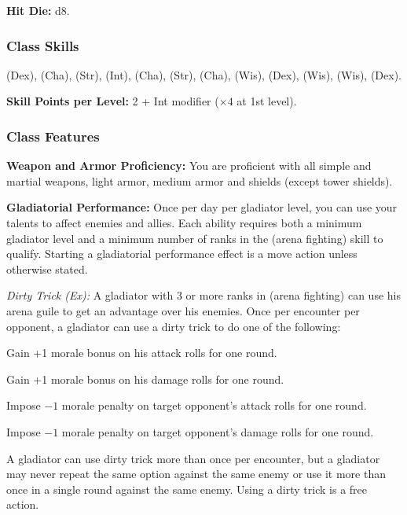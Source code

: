 \textbf{Hit Die:} d8.
\vskip2cm
\subsubsection{Class Skills}
 (Dex),  (Cha),  (Str),  (Int),  (Cha),  (Str),  (Cha),  (Wis),  (Dex),  (Wis),  (Wis),  (Dex).

\textbf{Skill Points per Level:} 2 + Int modifier ($\times4$ at 1st level).

\subsubsection{Class Features}

\textbf{Weapon and Armor Proficiency:} You are proficient with all simple and martial weapons, light armor, medium armor and shields (except tower shields).

\textbf{Gladiatorial Performance:} Once per day per gladiator level, you can use your talents to affect enemies and allies. Each ability requires both a minimum gladiator level and a minimum number of ranks in the  (arena fighting) skill to qualify. Starting a gladiatorial performance effect is a move action unless otherwise stated.

\textit{Dirty Trick (Ex):} A gladiator with 3 or more ranks in  (arena fighting) can use his arena guile to get an advantage over his enemies. Once per encounter per opponent, a gladiator can use a dirty trick to do one of the following:

\begin{itemize*}
\item Gain +1 morale bonus on his attack rolls for one round.
\item Gain +1 morale bonus on his damage rolls for one round.
\item Impose $-1$ morale penalty on target opponent's attack rolls for one round.
\item Impose $-1$ morale penalty on target opponent's damage rolls for one round.
\end{itemize*}

A gladiator can use dirty trick more than once per encounter, but a gladiator may never repeat the same option against the same enemy or use it more than once in a single round against the same enemy. Using a dirty trick is a free action.

